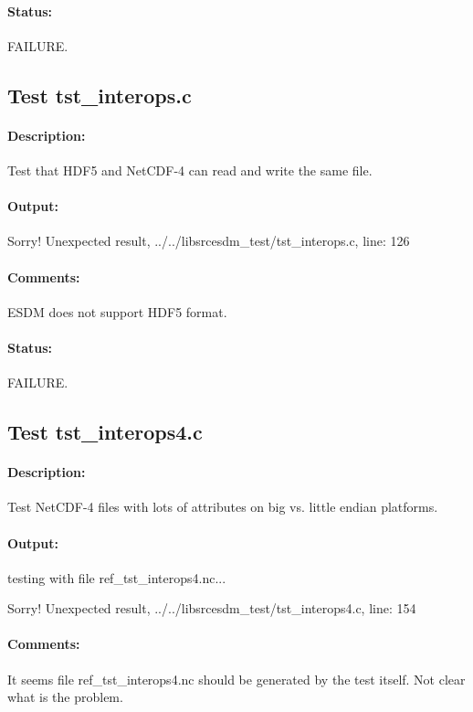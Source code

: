 \paragraph{Status:} FAILURE.

\subsection{Test tst\_interops.c}

\paragraph{Description:} Test that HDF5 and NetCDF-4 can read and write the same file.

\paragraph{Output:} Sorry! Unexpected result, ../../libsrcesdm\_test/tst\_interops.c, line: 126

\paragraph{Comments:} ESDM does not support HDF5 format.

\paragraph{Status:} FAILURE.

\subsection{Test tst\_interops4.c}

\paragraph{Description:} Test NetCDF-4 files with lots of attributes on big vs. little endian platforms.

\paragraph{Output:} testing with file ref\_tst\_interops4.nc...

Sorry! Unexpected result, ../../libsrcesdm\_test/tst\_interops4.c, line: 154

\paragraph{Comments:} It seems file ref\_tst\_interops4.nc should be generated by the test itself. Not clear what is the problem.

